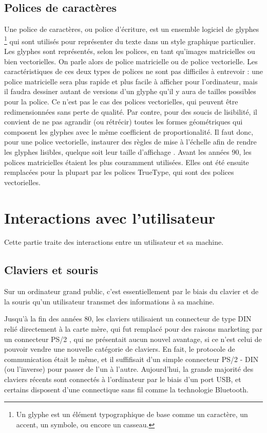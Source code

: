 \subsection{Polices de caractères}

Une police de caractères, ou police d'écriture, est un ensemble logiciel
de glyphes%
\footnote{Un glyphe est un élément typographique de base comme un caractère,
un accent, un symbole, ou encore un casseau.%
} qui sont utilisés pour représenter du texte dans un style graphique
particulier. Les glyphes sont représentés, selon les polices, en tant
qu'images matricielles ou bien vectorielles. On parle alors de police
matricielle ou de police vectorielle. Les caractéristiques de ces
deux types de polices ne sont pas difficiles à entrevoir : une police
matricielle sera plus rapide et plus facile à afficher pour l'ordinateur,
mais il faudra dessiner autant de versions d'un glyphe qu'il y aura
de tailles possibles pour la police. Ce n'est pas le cas des polices
vectorielles, qui peuvent être redimensionnées sans perte de qualité.
Par contre, pour des soucis de lisibilité, il convient de ne pas agrandir
(ou rétrécir) toutes les formes géométriques qui composent les glyphes
avec le même coefficient de proportionalité. Il faut donc, pour une
police vectorielle, instaurer des règles de mise à l'échelle afin
de rendre les glyphes lisibles, quelque soit leur taille d'affichage \cite{Tan04}. Avant les années 90, les polices matricielles étaient les plus couramment utilisées. Elles ont été ensuite remplacées pour la plupart par les
polices TrueType, qui sont des polices vectorielles.

\section{Interactions avec l'utilisateur}
Cette partie traite des interactions entre un utilisateur et sa machine.
\subsection{Claviers et souris}

Sur un ordinateur grand public, c'est essentiellement par le biais du
clavier et de la souris qu'un utilisateur transmet des informations
à sa machine. 

Jusqu'à la fin des années 80, les claviers utilisaient un connecteur
de type DIN relié directement à la carte mère, qui fut remplacé pour
des raisons marketing par un connecteur PS/2 \cite{PS/2}, qui ne présentait aucun
nouvel avantage, si ce n'est celui de pouvoir vendre une nouvelle
catégorie de claviers. En fait, le protocole de communication était le même, et il suffifisait d'un simple connecteur PS/2 - DIN (ou l'inverse) pour passer de l'un à l'autre. Aujourd'hui, la grande majorité des claviers
récents sont connectés à l'ordinateur par le biais d'un port USB,
et certains disposent d'une connectique sans fil comme la
technologie Bluetooth. 

